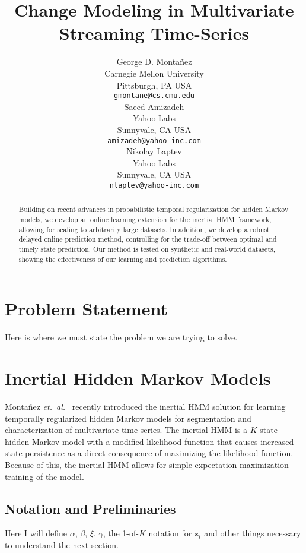 \documentclass{article}
\title{Change Modeling in Multivariate Streaming Time-Series}
\author{George D. Monta\~nez \\
Carnegie Mellon University\\
Pittsburgh, PA USA\\
\texttt{gmontane@cs.cmu.edu} \\
\And
Saeed Amizadeh\\
Yahoo Labs\\
Sunnyvale, CA USA\\
\texttt{amizadeh@yahoo-inc.com}\\
\And
Nikolay Laptev\\
Yahoo Labs\\
Sunnyvale, CA USA\\
\texttt{nlaptev@yahoo-inc.com}}
\begin{document}
\maketitle

\begin{abstract}
Building on recent advances in probabilistic temporal regularization for hidden Markov models, we develop an online learning extension for the inertial HMM framework, allowing for scaling to arbitrarily large datasets. In addition, we develop a robust delayed online prediction method, controlling for the trade-off between optimal and timely state prediction. Our method is tested on synthetic and real-world datasets, showing the effectiveness of our learning and prediction algorithms.
\end{abstract}



\section{Problem Statement}

Here is where we must state the problem we are trying to solve.

\section{Inertial Hidden Markov Models}

Monta\~nez \emph{et.\ al.}~ recently introduced the inertial HMM solution for learning temporally regularized hidden Markov models for segmentation and characterization of multivariate time series. The inertial HMM is a $K$-state hidden Markov model with a modified likelihood function that causes increased state persistence as a direct consequence of maximizing the likelihood function. Because of this, the inertial HMM allows for simple expectation maximization~\cite{dempster1977maximum} training of the model.

\subsection{Notation and Preliminaries}

Here I will define $\alpha$, $\beta$, $\xi$, $\gamma$, the 1-of-$K$ notation for $\mathbf{z}_t$ and  other things necessary to understand the next section.
\end{document}
